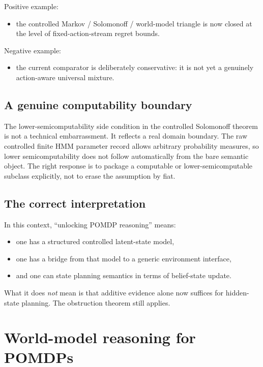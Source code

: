 \documentclass[11pt]{article}
\newcommand{\wm}{world-model}
\begin{document}
Positive example:
\begin{itemize}
  \item the controlled Markov / Solomonoff / \wm{} triangle is now closed at
        the level of fixed-action-stream regret bounds.
\end{itemize}

Negative example:
\begin{itemize}
  \item the current comparator is deliberately conservative: it is not yet a
        genuinely action-aware universal mixture.
\end{itemize}

\subsection{A genuine computability boundary}

The lower-semicomputability side condition in the controlled Solomonoff theorem
is not a technical embarrassment.  It reflects a real domain boundary.  The
raw controlled finite HMM parameter record allows arbitrary probability
measures, so lower semicomputability does not follow automatically from the
bare semantic object.  The right response is to package a computable or
lower-semicomputable subclass explicitly, not to erase the assumption by fiat.

\subsection{The correct interpretation}

In this context, ``unlocking POMDP reasoning'' means:
\begin{itemize}
  \item one has a structured controlled latent-state model,
  \item one has a bridge from that model to a generic environment interface,
  \item and one can state planning semantics in terms of belief-state update.
\end{itemize}

What it does \emph{not} mean is that additive evidence alone now suffices for
hidden-state planning.  The obstruction theorem still applies.

\section{World-model reasoning for POMDPs}
\end{document}
